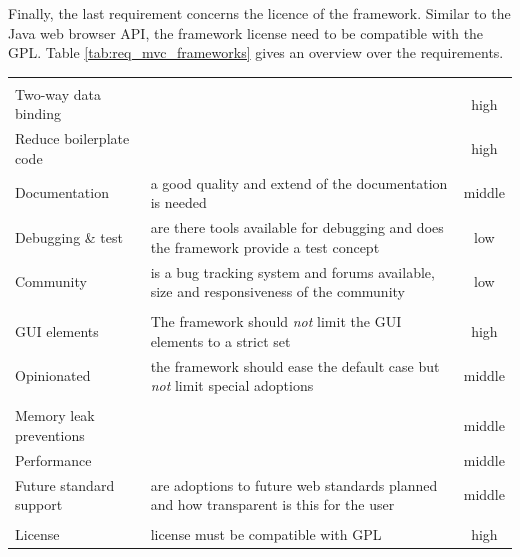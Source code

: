 Finally, the last requirement concerns the licence of the framework.
Similar to the Java web browser API, the framework license need to be compatible with the GPL.
Table \ref{tab:req_mvc_frameworks} gives an overview over the requirements.

\begin{minipage}{\linewidth}
	\centering
	\label{tab:req_mvc_frameworks}
	\begin{tabulary}{\textwidth}{|L|L|C|}
		\hline 
		 &  &  \tabularnewline		
		\hline
		\\
 		\hline
		Two-way data binding&  & high\tabularnewline
		\hline
		Reduce boilerplate code & & high\tabularnewline
		\hline
	 	Documentation & a good quality and extend of the documentation is needed & middle\tabularnewline
	 	\hline
	 	Debugging \& test & are there tools available for debugging and does the framework provide a test concept & low\tabularnewline
	  	\hline
	 	Community & is a bug tracking system and forums available, size and responsiveness of the community & low\tabularnewline
		\hline
	 	\tabularnewline
 		\hline
    		GUI elements & The framework should \emph{not} limit the GUI elements to a strict set & high\tabularnewline
    		\hline
		Opinionated & the framework should ease the default case but \emph{not} limit special adoptions & middle\tabularnewline
		\hline
	 	\tabularnewline
 		\hline
		Memory leak preventions & & middle \tabularnewline
	 	\hline
		Performance &  & middle\tabularnewline
	 	\hline
		Future standard support& are adoptions to future web standards planned and how transparent is this for the user & middle\tabularnewline
		\hline
	 	\tabularnewline
 		\hline
		License & license must be compatible with GPL & high\tabularnewline
 		\hline
 	\end{tabulary}
\end{minipage}

